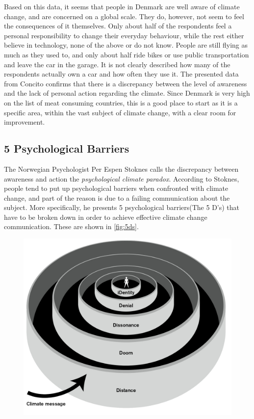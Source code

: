         Based on this data, it seems that people in Denmark are well aware of climate change, and are concerned on a global scale. They do, however, not seem to feel the consequences of it themselves. Only about half of the respondents feel a personal responsibility to change their everyday behaviour, while the rest either believe in technology, none of the above or do not know. People are still flying as much as they used to, and only about half ride bikes or use public transportation and leave the car in the garage. It is not clearly described how many of the respondents actually own a car and how often they use it. The presented data from Concito confirms that there is a discrepancy between the level of awareness and the lack of personal action regarding the climate. Since Denmark is very high on the list of meat consuming countries, this is a good place to start as it is a specific area, within the vast subject of climate change, with a clear room for improvement.
    
    \subsection{5 Psychological Barriers}\label{sec:5barriers}
        The Norwegian Psychologist Per Espen Stoknes calls the discrepancy between awareness and action the \textit{psychological climate paradox}\cite{storyAboutClimateChange, the5Ds}. According to Stoknes, people tend to put up psychological barriers when confronted with climate change, and part of the reason is due to a failing communication about the subject. More specifically, he presents 5 psychological barriers(The 5 D's) that have to be broken down in order to achieve effective climate change communication. These are shown in \autoref{fig:5ds}.
        
        \begin{figure}[H]
        	\centering
        	\includegraphics[width=0.9\linewidth]{figure/Analysis/5ds.png}
        	\label{fig:5ds}
        \end{figure}
        

